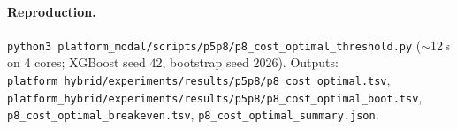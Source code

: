\paragraph{Reproduction.}
\texttt{python3 platform\_modal/scripts/p5p8/p8\_cost\_optimal\_threshold.py} ($\sim$12\,s on 4 cores; XGBoost
seed $42$, bootstrap seed $2026$). Outputs:
\texttt{platform\_hybrid/experiments/results/p5p8/p8\_cost\_optimal.tsv},
\texttt{platform\_hybrid/experiments/results/p5p8/p8\_cost\_optimal\_boot.tsv},
\texttt{p8\_cost\_optimal\_breakeven.tsv}, \texttt{p8\_cost\_optimal\_summary.json}.
